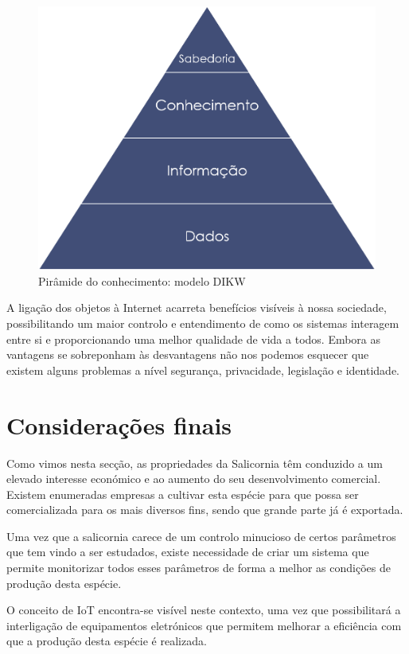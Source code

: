 \begin{figure}[!htb]
	\centering
	\includegraphics[scale=0.3]{img/cap3-iot/dikw.png}
	\caption{Pirâmide do conhecimento: modelo DIKW}
	\label{dikw1}
\end{figure}



A ligação dos objetos à Internet acarreta benefícios visíveis à nossa sociedade, possibilitando um maior controlo e entendimento de como os sistemas interagem entre si e proporcionando uma melhor qualidade de vida a todos. Embora as vantagens se sobreponham às desvantagens não nos podemos esquecer que existem alguns problemas a nível segurança, privacidade, legislação e identidade.



\section{Considerações finais}


Como vimos nesta secção, as propriedades da Salicornia têm conduzido a um elevado interesse económico e ao aumento do seu desenvolvimento comercial. Existem enumeradas empresas a cultivar esta espécie para que possa ser comercializada para os mais diversos fins, sendo que grande parte já é exportada. 

Uma vez que a salicornia carece de um controlo minucioso de certos parâmetros que tem vindo a ser estudados, existe necessidade de criar um sistema que permite monitorizar todos esses parâmetros de forma a melhor as condições de produção desta espécie. 

O conceito de \ac{IoT} encontra-se visível neste contexto, uma vez que possibilitará a interligação de equipamentos eletrónicos que permitem melhorar a eficiência com que a produção desta espécie é realizada.  

 





